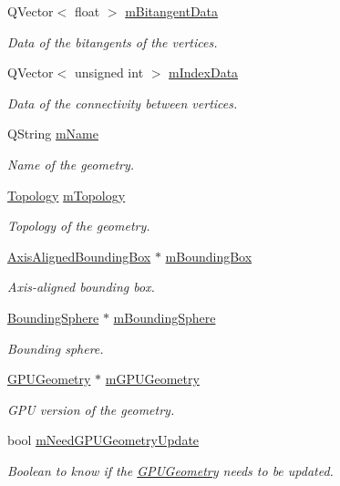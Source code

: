 \begin{DoxyCompactItemize}
Q\+Vector$<$ float $>$ \hyperlink{class_geometry_a965032c7634b3aaea165ffb1e9549b82}{m\+Bitangent\+Data}
\begin{DoxyCompactList}\small\item\em Data of the bitangents of the vertices. \end{DoxyCompactList}\item 
Q\+Vector$<$ unsigned int $>$ \hyperlink{class_geometry_ae0b8310174599d67910b0a5e33421106}{m\+Index\+Data}
\begin{DoxyCompactList}\small\item\em Data of the connectivity between vertices. \end{DoxyCompactList}\item 
Q\+String \hyperlink{class_geometry_a9831671d273039dd55c23be1198540eb}{m\+Name}
\begin{DoxyCompactList}\small\item\em Name of the geometry. \end{DoxyCompactList}\item 
\hyperlink{class_geometry_af0136a3b268286ee5921cc6af5239293}{Topology} \hyperlink{class_geometry_acfa146681080dedfb14420ba51b8b52a}{m\+Topology}
\begin{DoxyCompactList}\small\item\em Topology of the geometry. \end{DoxyCompactList}\item 
\hyperlink{class_axis_aligned_bounding_box}{Axis\+Aligned\+Bounding\+Box} $\ast$ \hyperlink{class_geometry_a8094cba464c4943a478092b73f7364f9}{m\+Bounding\+Box}
\begin{DoxyCompactList}\small\item\em Axis-\/aligned bounding box. \end{DoxyCompactList}\item 
\hyperlink{class_bounding_sphere}{Bounding\+Sphere} $\ast$ \hyperlink{class_geometry_a8dba41b46c1f6b4006a96449157b3357}{m\+Bounding\+Sphere}
\begin{DoxyCompactList}\small\item\em Bounding sphere. \end{DoxyCompactList}\item 
\hyperlink{class_g_p_u_geometry}{G\+P\+U\+Geometry} $\ast$ \hyperlink{class_geometry_a9df7e43cff221adde5c369d21a1933b9}{m\+G\+P\+U\+Geometry}
\begin{DoxyCompactList}\small\item\em G\+P\+U version of the geometry. \end{DoxyCompactList}\item 
bool \hyperlink{class_geometry_a44193e1c6e4d8678c0e466a1688a1d1b}{m\+Need\+G\+P\+U\+Geometry\+Update}
\begin{DoxyCompactList}\small\item\em Boolean to know if the \hyperlink{class_g_p_u_geometry}{G\+P\+U\+Geometry} needs to be updated. \end{DoxyCompactList}\end{DoxyCompactItemize}


